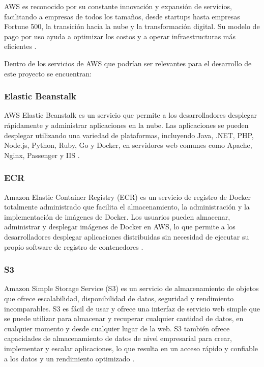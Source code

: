 AWS es reconocido por su constante innovación y expansión de servicios,
facilitando a empresas de todos los tamaños, desde startups hasta empresas
Fortune 500, la transición hacia la nube y la transformación digital. Su modelo
de pago por uso ayuda a optimizar los costos y a operar infraestructuras más
eficientes \cite{wittig2023amazon}.

Dentro de los servicios de AWS que podrían ser relevantes para el desarrollo de
este proyecto se encuentran:

\subsubsection{Elastic Beanstalk}
AWS Elastic Beanstalk es un servicio que permite a los desarrolladores desplegar
rápidamente y administrar aplicaciones en la nube. Las aplicaciones se pueden
desplegar utilizando una variedad de plataformas, incluyendo Java, .NET, PHP,
Node.js, Python, Ruby, Go y Docker, en servidores web comunes como Apache, Nginx,
Passenger y IIS \cite{thinkwik_2018_aws}.

\subsubsection{ECR}
Amazon Elastic Container Registry (ECR) es un servicio de registro de Docker
totalmente administrado que facilita el almacenamiento, la administración y
la implementación de imágenes de Docker. Los usuarios pueden almacenar,
administrar y desplegar imágenes de Docker en AWS, lo que permite a los
desarrolladores desplegar aplicaciones distribuidas sin necesidad de ejecutar
su propio software de registro de contenedores \cite{thinkwik_2018_aws}.

\subsubsection{S3}
Amazon Simple Storage Service (S3) es un servicio de almacenamiento de objetos
que ofrece escalabilidad, disponibilidad de datos, seguridad y rendimiento
incomparables. S3 es fácil de usar y ofrece una interfaz de servicio web simple
que se puede utilizar para almacenar y recuperar cualquier cantidad de datos,
en cualquier momento y desde cualquier lugar de la web. S3 también ofrece
capacidades de almacenamiento de datos de nivel empresarial para crear,
implementar y escalar aplicaciones, lo que resulta en un acceso rápido y
confiable a los datos y un rendimiento optimizado \cite{cloud2011amazon}.

